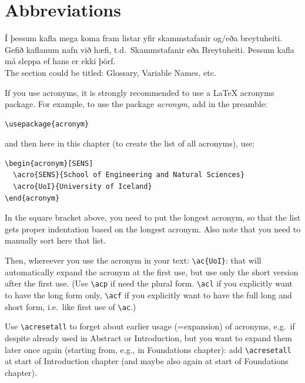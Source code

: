 \documentclass[a4paper,12pt,twoside,BCOR=10mm]{scrbook}
\begin{document}
\newpage %
\hypersetup{pageanchor=true}
\tableofcontents
\listoffigures
\listoftables
\lstlistoflistings

\chapter*{Abbreviations}

Í þessum kafla mega koma fram listar yfir skammstafanir og/eða breytuheiti. Gefið kaflanum nafn við hæfi, t.d.\ Skammstafanir eða Breytuheiti. Þessum kafla má sleppa ef hans er ekki þörf. \\

The section could be titled: Glossary, Variable Names, etc.

If you use acronyms, it is strongly recommended to use a LaTeX
acronyms package. For example, to use the package \emph{acronym}, add
in the preamble:
\begin{verbatim}
\usepackage{acronym}
\end{verbatim}
and then here in this chapter (to create the list of all acronyms), use:
\begin{verbatim}
\begin{acronym}[SENS]
  \acro{SENS}{School of Engineering and Natural Sciences}
  \acro{UoI}{University of Iceland}
\end{acronym}
\end{verbatim}
In the square bracket above, you need to put the longest acronym, so
that the list gets proper indentation based on the longest acronym.
Also note that you need to manually sort here that list.

Then, whereever you use the acronym in your text: \verb|\ac{UoI}|:
that will automatically expand the acronym at the first use, but use
only the short version after the first use.  (Use \verb|\acp| if need
the plural form. \verb|\acl| if you explicitly want to have the long
form only, \verb|\acf| if you explicitly want to have the full long
and short form, i.e.\ like first use of \verb|\ac|.)

Use \verb|\acresetall| to forget about earlier usage (=expansion) of
acronyms, e.g.\ if despite already used in Abstract or Introduction,
but you want to expand them later once again (starting from, e.g., in
Foundations chapter): add \verb|\acresetall| at start of Introduction
chapter (and maybe also again at start of Foundations chapter).
\end{document}
